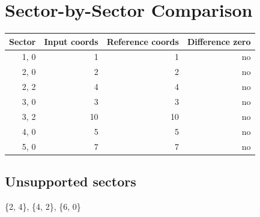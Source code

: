 \documentclass[11pt]{article}
\begin{document}
\section{Sector-by-Sector Comparison}
\begin{longtable}{rrrr}
\toprule
Sector & Input coords & Reference coords & Difference zero \\
\midrule
{1, 0} & 1 & 1 & no \\
{2, 0} & 2 & 2 & no \\
{2, 2} & 4 & 4 & no \\
{3, 0} & 3 & 3 & no \\
{3, 2} & 10 & 10 & no \\
{4, 0} & 5 & 5 & no \\
{5, 0} & 7 & 7 & no \\
\bottomrule
\end{longtable}
\subsection{Unsupported sectors}
\{2, 4\}, \{4, 2\}, \{6, 0\}
\end{document}
